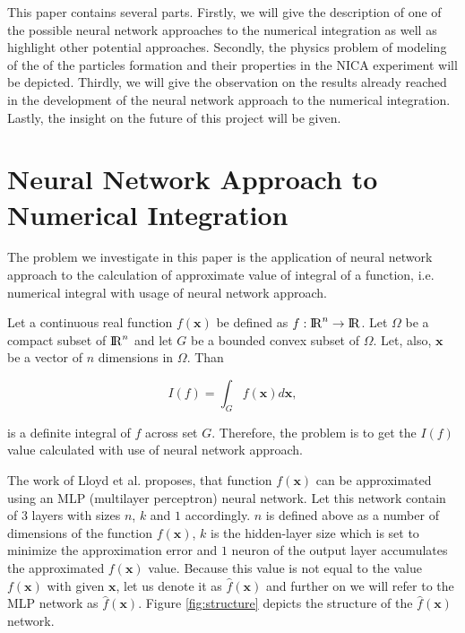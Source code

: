 \documentclass[%
]{ittmm}
\begin{document}
This paper contains several parts. Firstly, we will give the description of one of the possible neural network approaches to the numerical integration as well as highlight other potential approaches. Secondly, the physics problem of modeling of the of the particles formation and their properties in the NICA experiment will be depicted. Thirdly, we will give the observation on the results already reached in the development of the neural network approach to the numerical integration. Lastly, the insight on the future of this project will be given. 

\section{Neural Network Approach to Numerical Integration}

The problem we investigate in this paper is the application of neural network approach to the calculation of approximate value of integral of a function, i.e. numerical integral with usage of neural network approach.

Let a continuous real function $f(\mathbf{x})$ be defined as $f: {\rm I\!R}^n \to {\rm I\!R}$. Let $\Omega$ be a compact subset of ${\rm I\!R}^n$ and let $G$ be a bounded convex subset of $\Omega$. Let, also, $\mathbf{x}$ be a vector of $n$ dimensions in $\Omega$. Than

\begin{equation}
    \label{eq: integral definition}
    I(f) = \int_G f(\mathbf{x})d\mathbf{x},
\end{equation}

\noindent is a definite integral of $f$ across set $G$. Therefore, the problem is to get the $I(f)$ value calculated with use of neural network approach.

The work of Lloyd et al.\cite{lloyd2020using} proposes, that function $f(\mathbf{x})$ can be approximated using an MLP (multilayer perceptron) neural network. Let this network contain of 3 layers with sizes $n$, $k$ and $1$ accordingly. $n$ is defined above as a number of dimensions of the function $f(\mathbf{x})$, $k$ is the hidden-layer size which is set to minimize the approximation error and $1$ neuron of the output layer accumulates the approximated $f(\mathbf{x})$ value. Because this value is not equal to the value $f(\mathbf{x})$ with given $\mathbf{x}$, let us denote it as $\hat{f}(\mathbf{x})$ and further on we will refer to the MLP network as $\hat{f}(\mathbf{x})$. Figure \ref{fig:structure} depicts the structure of the $\hat{f}(\mathbf{x})$ network. 
\end{document}
